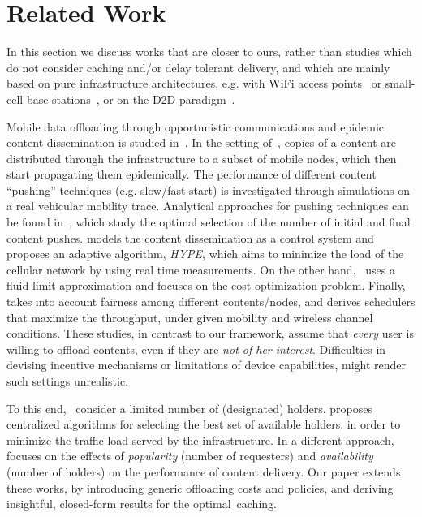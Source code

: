\documentclass[10pt,conference,letterpaper]{IEEEtran}
\begin{document}
\section{Related Work}\label{sec:related}
In this section we discuss works that are closer to ours, rather than studies which do not consider caching and/or delay tolerant delivery, and which are mainly based on pure infrastructure architectures, e.g. with WiFi access points~\cite{Offloading-Wifi} or small-cell base stations~\cite{femtocell-survey,HetNets-paradigm}, or on the D2D paradigm~\cite{survey-d2d}.

Mobile data offloading through opportunistic communications and epidemic content dissemination is studied in~\cite{offloading-wowmom11,offloading-control-theory,fluid-limit-mass2012,offloading-double-opportunities}. In the setting of~\cite{offloading-wowmom11}, copies of a content are distributed through the infrastructure to a subset of mobile nodes, which then start propagating them epidemically. The performance of different content ``pushing'' techniques (e.g. slow/fast start) is investigated through simulations on a real vehicular mobility trace. Analytical approaches for pushing techniques can be found in~\cite{offloading-control-theory,fluid-limit-mass2012}, which study the optimal selection of the number of initial and final content pushes. \cite{offloading-control-theory} models the content dissemination as a control system and proposes an adaptive algorithm, \textit{HYPE}, which aims to minimize the load of the cellular network by using real time measurements. On the other hand,~\cite{fluid-limit-mass2012} uses a fluid limit approximation and focuses on the cost optimization problem. Finally,~\cite{offloading-double-opportunities} takes into account fairness among different contents/nodes, and derives schedulers that maximize the throughput, under given mobility and wireless channel conditions. These studies, in contrast to our framework, assume that \textit{every} user is willing to offload contents, even if they are \textit{not of her interest}. Difficulties in devising incentive mechanisms or limitations of device capabilities, might render such settings unrealistic.

To this end,~\cite{multiple-offloading,pavlos-not-all-content} consider a limited number of (designated) holders. \cite{multiple-offloading} proposes centralized algorithms for selecting the best set of available holders, in order to minimize the traffic load served by the infrastructure. In a different approach,~\cite{pavlos-not-all-content} focuses on the effects of \textit{popularity} (number of requesters) and \textit{availability} (number of holders) on the performance of content delivery. Our paper extends these works, by introducing generic offloading costs and policies, and deriving insightful, closed-form results for the optimal~caching.
\end{document}
